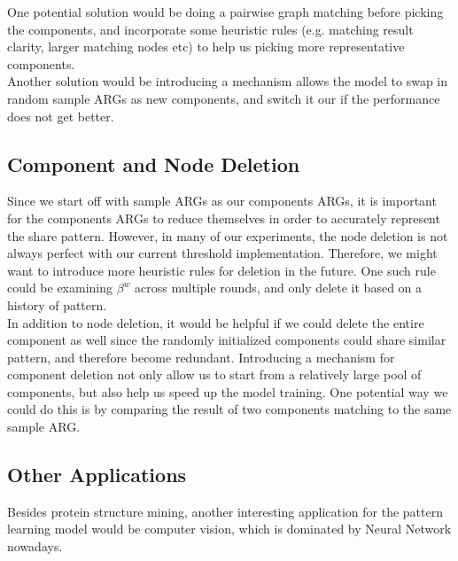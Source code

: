 One potential solution would be doing a pairwise graph matching before picking the components, and incorporate some heuristic rules (e.g. matching result clarity, larger matching nodes etc) to help us picking more representative components.\\

Another solution would be introducing a mechanism allows the model to swap in random sample ARGs as new components, and switch it our if the performance does not get better.

\subsection{Component and Node Deletion}

Since we start off with sample ARGs as our components ARGs, it is important for the components ARGs to reduce themselves in order to accurately represent the share pattern. However, in many of our experiments, the node deletion is not always perfect with our current threshold implementation. Therefore, we might want to introduce more heuristic rules for deletion in the future. One such rule could be examining $\beta^w$ across multiple rounds, and only delete it based on a history of pattern.\\

In addition to node deletion, it would be helpful if we could delete the entire component as well since the randomly initialized components could share similar pattern, and therefore become redundant. Introducing a mechanism for component deletion not only allow us to start from a relatively large pool of components, but also help us speed up the model training. One potential way we could do this is by comparing the result of two components matching to the same sample ARG.

\subsection{Other Applications}

Besides protein structure mining, another interesting application for the pattern learning model would be computer vision, which is dominated by Neural Network nowadays.\\


